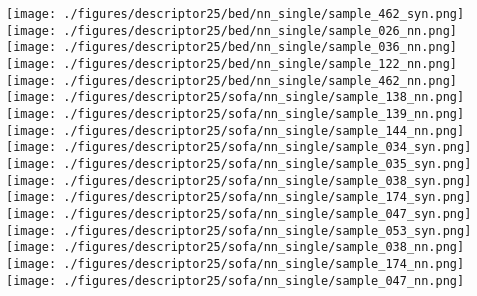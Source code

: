 \documentclass[10pt,twocolumn,letterpaper]{article}
\begin{document}
\begin{figure*}[h]
    \texttt{[image: ./figures/descriptor25/bed/nn\_single/sample\_462\_syn.png]}     
    \texttt{[image: ./figures/descriptor25/bed/nn\_single/sample\_026\_nn.png]}  \hspace{-1mm}
    \texttt{[image: ./figures/descriptor25/bed/nn\_single/sample\_036\_nn.png]}  \hspace{-1mm} 
    \texttt{[image: ./figures/descriptor25/bed/nn\_single/sample\_122\_nn.png]} \hspace{-1mm}
    \texttt{[image: ./figures/descriptor25/bed/nn\_single/sample\_462\_nn.png]}     
      \\
    \texttt{[image: ./figures/descriptor25/sofa/nn\_single/sample\_138\_nn.png]}           \hspace{-1mm}
     \texttt{[image: ./figures/descriptor25/sofa/nn\_single/sample\_139\_nn.png]}           \hspace{-1mm}
     \texttt{[image: ./figures/descriptor25/sofa/nn\_single/sample\_144\_nn.png]}           
     \texttt{[image: ./figures/descriptor25/sofa/nn\_single/sample\_034\_syn.png]}           \hspace{-1mm}  
      \texttt{[image: ./figures/descriptor25/sofa/nn\_single/sample\_035\_syn.png]}           \hspace{-1mm}    
      \texttt{[image: ./figures/descriptor25/sofa/nn\_single/sample\_038\_syn.png]}           \hspace{-1mm}
      \texttt{[image: ./figures/descriptor25/sofa/nn\_single/sample\_174\_syn.png]}           \hspace{-1mm}     
      \texttt{[image: ./figures/descriptor25/sofa/nn\_single/sample\_047\_syn.png]}           \hspace{-1mm} 
      \texttt{[image: ./figures/descriptor25/sofa/nn\_single/sample\_053\_syn.png]}           
      \texttt{[image: ./figures/descriptor25/sofa/nn\_single/sample\_038\_nn.png]}           \hspace{-1mm}
      \texttt{[image: ./figures/descriptor25/sofa/nn\_single/sample\_174\_nn.png]}           \hspace{-1mm}     
      \texttt{[image: ./figures/descriptor25/sofa/nn\_single/sample\_047\_nn.png]}           \hspace{-1mm} 

\end{figure*}
\end{document}
